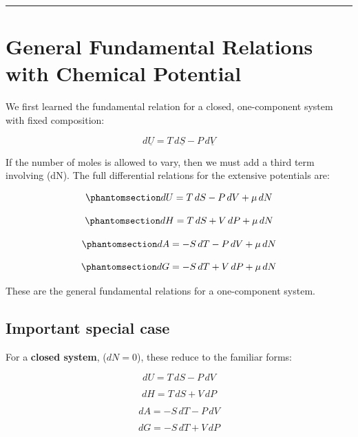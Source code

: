 \documentclass[
  letterpaper,
  DIV=11,
  numbers=noendperiod]{scrartcl}
\begin{document}
\begin{center}\rule{0.5\linewidth}{0.5pt}\end{center}

\section{General Fundamental Relations with Chemical
Potential}\label{general-fundamental-relations-with-chemical-potential}

We first learned the fundamental relation for a closed, one-component
system with fixed composition:

\[
d\underline{U} = T\,d\underline{S} - P\,d\underline{V}
\]

If the number of moles is allowed to vary, then we must add a third term
involving (dN). The full differential relations for the extensive
potentials are:

\begin{equation}\phantomsection\label{eq-fundamental-U}{
dU = T\,dS - P\,dV + \mu\,dN
}\end{equation}

\begin{equation}\phantomsection\label{eq-fundamental-H}{
dH = T\,dS + V\,dP + \mu\,dN
}\end{equation}

\begin{equation}\phantomsection\label{eq-fundamental-A}{
dA = -S\,dT - P\,dV + \mu\,dN
}\end{equation}

\begin{equation}\phantomsection\label{eq-fundamental-G}{
dG = -S\,dT + V\,dP + \mu\,dN
}\end{equation}

These are the general fundamental relations for a one-component system.

\subsection{Important special case}\label{important-special-case}

For a \textbf{closed system}, (\(dN=0\)), these reduce to the familiar
forms:

\[
dU = T\,dS - P\,dV
\]

\[
dH = T\,dS + V\,dP
\]

\[
dA = -S\,dT - P\,dV
\]

\[
dG = -S\,dT + V\,dP
\]
\end{document}
